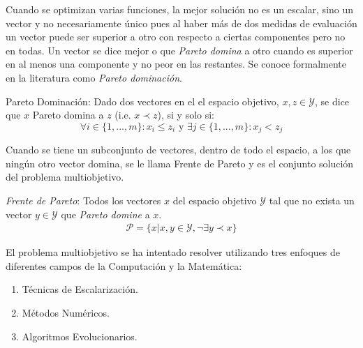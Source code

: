 Cuando se optimizan varias funciones, la mejor soluci\'on  no es un escalar, sino un vector y no necesariamente \'unico pues al haber m\'as de dos medidas de evaluaci\'on un vector puede ser superior a otro con respecto a ciertas componentes pero no en todas. Un vector se dice mejor o que \textit{Pareto domina} a otro cuando es superior en al menos una componente y no peor en las restantes. Se conoce formalmente en la literatura como \textit{Pareto dominaci\'on}.
\begin{definition}{Pareto Dominaci\'on:}
    \label{background:def:domintation}
    Dado dos vectores en el el espacio objetivo, $x, z \in \mathcal{Y}$, se dice que $x$ Pareto domina a $z$ (i.e. $x \prec z$), si y solo si:
    \begin{equation*}
        \forall i \in \{1, ..., m\}: x_i \leq z_i \text{ y } \exists j \in \{1, ..., m\}: x_j < z_j
    \end{equation*}
\end{definition}

Cuando se tiene un subconjunto de vectores, dentro de todo el espacio,  a los que ning\'un otro vector domina, se le  llama Frente de Pareto y es el conjunto soluci\'on del problema multiobjetivo.

\begin{definition}
    \label{background:def:pareto_front}
    \textit{Frente de Pareto}: Todos los vectores $x$ del espacio objetivo $\mathcal{Y}$ tal que no exista un vector $y \in \mathcal{Y}$ que \textit{Pareto domine} a $x$.
    \begin{align*}
        \mathcal{P} = \{x| x, y \in \mathcal{Y}, \neg \exists y \prec x \} 
    \end{align*}
\end{definition}



El problema multiobjetivo se ha intentado resolver utilizando tres enfoques de diferentes campos de la Computaci\'on y la Matem\'atica:
\begin{enumerate}
    \item T\'ecnicas de Escalarizaci\'on.
    \item M\'etodos Num\'ericos.
    \item Algoritmos Evolucionarios.
\end{enumerate}



